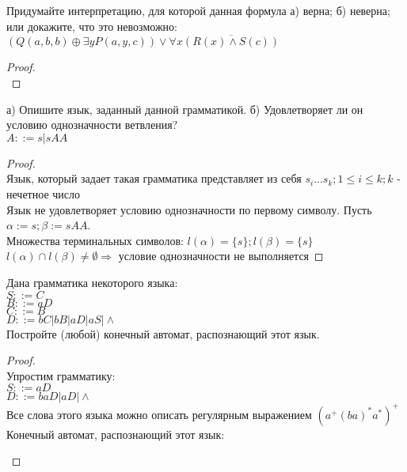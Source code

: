 \begin{problem}
Придумайте интерпретацию, для которой данная формула а) верна; б) неверна; или докажите, что это невозможно:\\
$(Q(a, b, b) \oplus \exists y P(a, y, c)) \vee \forall x \overline{(R(x) \wedge S(c))}$
\end{problem}
\begin{proof} $ $\\

\end{proof}


\begin{problem}
а) Опишите язык, заданный данной грамматикой. б) Удовлетворяет ли он условию однозначности ветвления?\\
$A ::= s|sAA$
\end{problem}
\begin{proof} $ $\\
Язык, который задает такая грамматика представляет из себя $s_i...s_k; 1 \leq i \leq k; k$ - нечетное число\\
Язык не удовлетворяет условию однозначности по первому символу. Пусть $\alpha := s; \beta := sAA$.\\
Множества терминальных символов: $l(\alpha) = \{s\}; l(\beta) = \{s\}$\\
$l(\alpha) \cap l(\beta) \neq \emptyset \Rightarrow $ условие однозначности не выполняется
\end{proof}


\begin{problem}
Дана грамматика некоторого языка:\\
$S ::= C$\\
$B ::= aD$\\
$C ::= B$\\
$D ::= bC|bB|aD|aS|\wedge$\\
Постройте (любой) конечный автомат, распознающий этот
язык.
\end{problem}
\begin{proof} $ $\\
Упростим грамматику:\\
$S ::= aD$\\
$D ::= baD|aD|\wedge$\\
Все слова этого языка можно описать регулярным выражением $(a^+(ba)^*a^*)^+$\\
Конечный автомат, распознающий этот язык:\\
\begin{center}
\end{center}

\end{proof}


